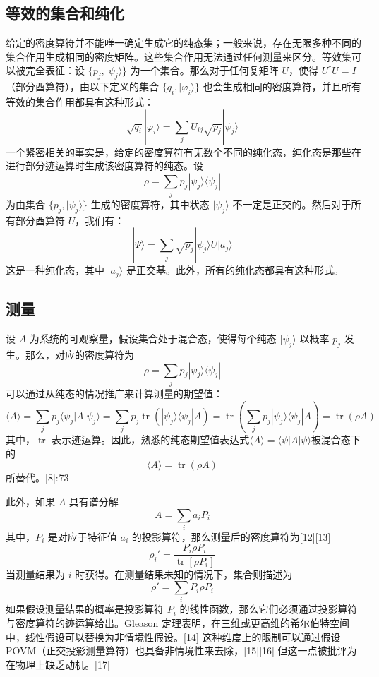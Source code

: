 \subsection{等效的集合和纯化} 
给定的密度算符并不能唯一确定生成它的纯态集；一般来说，存在无限多种不同的集合作用生成相同的密度矩阵。这些集合作用无法通过任何测量来区分。等效集可以被完全表征：设  
\(\{ p_j, |\psi_j\rangle \}\)  
为一个集合。那么对于任何复矩阵 \(U\)，使得  
\( U^\dagger U = I \)（部分酉算符），由以下定义的集合  
\(\{ q_i, |\varphi_i\rangle \}\)  
也会生成相同的密度算符，并且所有等效的集合作用都具有这种形式：
\[
\sqrt{q_i} |\varphi_i\rangle = \sum_j U_{ij} \sqrt{p_j} |\psi_j\rangle~
\]
一个紧密相关的事实是，给定的密度算符有无数个不同的纯化态，纯化态是那些在进行部分迹运算时生成该密度算符的纯态。设  
\[\rho = \sum_j p_j |\psi_j\rangle \langle \psi_j|~\] 
为由集合  
\(\{ p_j, |\psi_j\rangle \}\)  
生成的密度算符，其中状态  
\( |\psi_j\rangle \) 不一定是正交的。然后对于所有部分酉算符 \( U \)，我们有：
\[
|\Psi\rangle = \sum_j \sqrt{p_j} |\psi_j\rangle U |a_j\rangle~
\]
这是一种纯化态，其中  
\( |a_j\rangle \) 是正交基。此外，所有的纯化态都具有这种形式。
\subsection{测量}  
设 \(A\) 为系统的可观察量，假设集合处于混合态，使得每个纯态 \( |\psi_j\rangle \) 以概率 \( p_j \) 发生。那么，对应的密度算符为
\[
\rho = \sum_j p_j |\psi_j\rangle \langle \psi_j|~
\]
可以通过从纯态的情况推广来计算测量的期望值：
\[
\langle A \rangle = \sum_j p_j \langle \psi_j | A | \psi_j \rangle = \sum_j p_j \operatorname{tr} \left( |\psi_j\rangle \langle \psi_j| A \right) = \operatorname{tr} \left( \sum_j p_j |\psi_j\rangle \langle \psi_j| A \right) = \operatorname{tr} (\rho A)~
\]
其中，\(\operatorname{tr}\) 表示迹运算。因此，熟悉的纯态期望值表达式\(\langle A \rangle = \langle \psi | A | \psi \rangle\)被混合态下的
\[
\langle A \rangle = \operatorname{tr} (\rho A)~
\]
所替代。[8]: 73 

此外，如果 \(A\) 具有谱分解
\[
A = \sum_i a_i P_i~
\]
其中，\(P_i\) 是对应于特征值 \(a_i\) 的投影算符，那么测量后的密度算符为[12][13]
\[
\rho_i' = \frac{P_i \rho P_i}{\operatorname{tr}[\rho P_i]}~
\]
当测量结果为 \(i\) 时获得。在测量结果未知的情况下，集合则描述为
\[
\rho' = \sum_i P_i \rho P_i~
\]
如果假设测量结果的概率是投影算符 \(P_i\) 的线性函数，那么它们必须通过投影算符与密度算符的迹运算给出。Gleason 定理表明，在三维或更高维的希尔伯特空间中，线性假设可以替换为非情境性假设。[14] 这种维度上的限制可以通过假设 POVM（正交投影测量算符）也具备非情境性来去除，[15][16] 但这一点被批评为在物理上缺乏动机。[17]
